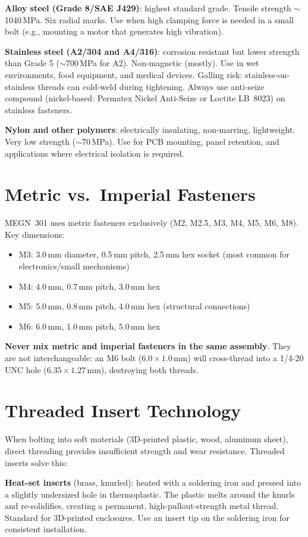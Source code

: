 \documentclass[11pt,letterpaper,twoside,openany]{book}
\begin{document}
\textbf{Alloy steel (Grade 8/SAE J429)}: highest standard grade. Tensile strength $\sim$1040\,MPa. Six radial marks. Use when high clamping force is needed in a small bolt (e.g., mounting a motor that generates high vibration).

\textbf{Stainless steel (A2/304 and A4/316)}: corrosion resistant but lower strength than Grade 5 ($\sim$700\,MPa for A2). Non-magnetic (mostly). Use in wet environments, food equipment, and medical devices. Galling risk: stainless-on-stainless threads can cold-weld during tightening. Always use anti-seize compound (nickel-based: Permatex Nickel Anti-Seize or Loctite LB~8023) on stainless fasteners.

\textbf{Nylon and other polymers}: electrically insulating, non-marring, lightweight. Very low strength ($\sim$70\,MPa). Use for PCB mounting, panel retention, and applications where electrical isolation is required.

\section{Metric vs.\ Imperial Fasteners}
MEGN~301 uses metric fasteners exclusively (M2, M2.5, M3, M4, M5, M6, M8). Key dimensions:

\begin{itemize}[nosep,leftmargin=1.5em]
\item M3: 3.0\,mm diameter, 0.5\,mm pitch, 2.5\,mm hex socket (most common for electronics/small mechanisms)
\item M4: 4.0\,mm, 0.7\,mm pitch, 3.0\,mm hex
\item M5: 5.0\,mm, 0.8\,mm pitch, 4.0\,mm hex (structural connections)
\item M6: 6.0\,mm, 1.0\,mm pitch, 5.0\,mm hex
\end{itemize}

\textbf{Never mix metric and imperial fasteners in the same assembly}. They are not interchangeable: an M6 bolt ($6.0\times 1.0$\,mm) will cross-thread into a 1/4-20 UNC hole ($6.35\times 1.27$\,mm), destroying both threads.

\section{Threaded Insert Technology}
When bolting into soft materials (3D-printed plastic, wood, aluminum sheet), direct threading provides insufficient strength and wear resistance. Threaded inserts solve this:

\textbf{Heat-set inserts} (brass, knurled): heated with a soldering iron and pressed into a slightly undersized hole in thermoplastic. The plastic melts around the knurls and re-solidifies, creating a permanent, high-pullout-strength metal thread. Standard for 3D-printed enclosures. Use an insert tip on the soldering iron for consistent installation.
\end{document}
